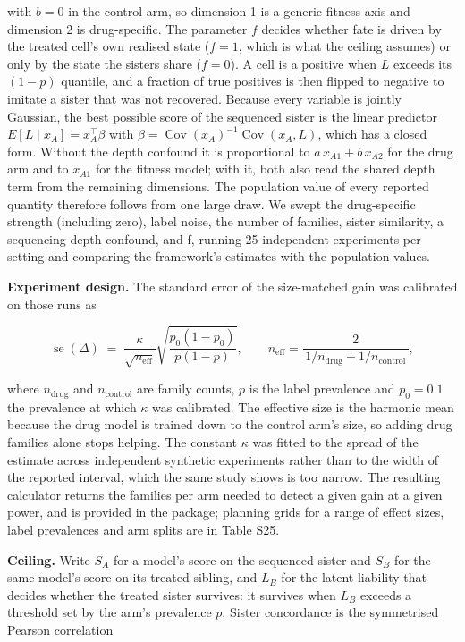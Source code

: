 \documentclass[11pt,a4paper]{article}
\begin{document}
with $b = 0$ in the control arm, so dimension 1 is a generic fitness axis and dimension 2 is drug-specific. The parameter $f$ decides whether fate is driven by the treated cell's own realised state ($f = 1$, which is what the ceiling assumes) or only by the state the sisters share ($f = 0$). A cell is a positive when $L$ exceeds its $(1-p)$ quantile, and a fraction of true positives is then flipped to negative to imitate a sister that was not recovered. Because every variable is jointly Gaussian, the best possible score of the sequenced sister is the linear predictor $E[L \mid x_A] = x_A^\top \beta$ with $\beta = \operatorname{Cov}(x_A)^{-1}\operatorname{Cov}(x_A, L)$, which has a closed form. Without the depth confound it is proportional to $a\,x_{A1} + b\,x_{A2}$ for the drug arm and to $x_{A1}$ for the fitness model; with it, both also read the shared depth term from the remaining dimensions. The population value of every reported quantity therefore follows from one large draw. We swept the drug-specific strength (including zero), label noise, the number of families, sister similarity, a sequencing-depth confound, and f, running 25 independent experiments per setting and comparing the framework's estimates with the population values.

\textbf{Experiment design.} The standard error of the size-matched gain was calibrated on those runs as

\begin{equation}
\operatorname{se}(\Delta) \;=\; \frac{\kappa}{\sqrt{n_{\text{eff}}}}
\sqrt{\frac{p_0(1-p_0)}{p(1-p)}}, \qquad
n_{\text{eff}} = \frac{2}{\,1/n_{\text{drug}} + 1/n_{\text{control}}\,},
\end{equation}

where $n_{\text{drug}}$ and $n_{\text{control}}$ are family counts, $p$ is the label prevalence and $p_0 = 0.1$ the prevalence at which $\kappa$ was calibrated. The effective size is the harmonic mean because the drug model is trained down to the control arm's size, so adding drug families alone stops helping. The constant $\kappa$ was fitted to the spread of the estimate across independent synthetic experiments rather than to the width of the reported interval, which the same study shows is too narrow. The resulting calculator returns the families per arm needed to detect a given gain at a given power, and is provided in the package; planning grids for a range of effect sizes, label prevalences and arm splits are in Table S25.

\textbf{Ceiling.} Write $S_A$ for a model's score on the sequenced sister and $S_B$ for the same model's score on its treated sibling, and $L_B$ for the latent liability that decides whether the treated sister survives: it survives when $L_B$ exceeds a threshold set by the arm's prevalence $p$. Sister concordance is the symmetrised Pearson correlation
\end{document}
